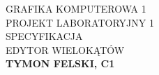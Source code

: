 \documentclass[12pt]{article}
\begin{document}
\begin{titlepage}

  \fancyhead{}
  \fancyfoot{}


  \begin{center}
    \huge{GRAFIKA KOMPUTEROWA 1}\\
    \huge{PROJEKT LABORATORYJNY 1}\\
    \Large{SPECYFIKACJA}\\
    \Large{EDYTOR WIELOKĄTÓW}\\
    \large\textbf{TYMON FELSKI, C1}\\
  \end{center}

\end{titlepage}
\end{document}
